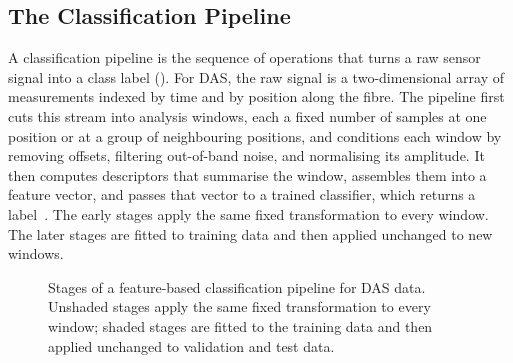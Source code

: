 \subsection{The Classification Pipeline}
\label{sec:chap2Pipeline}
A classification pipeline is the sequence of operations that turns a raw sensor signal into a class label (). For DAS, the raw signal is a two-dimensional array of measurements indexed by time and by position along the fibre. The pipeline first cuts this stream into analysis windows, each a fixed number of samples at one position or at a group of neighbouring positions, and conditions each window by removing offsets, filtering out-of-band noise, and normalising its amplitude. It then computes descriptors that summarise the window, assembles them into a feature vector, and passes that vector to a trained classifier, which returns a label~\cite{kandamali2022ml,shahabudin2025review}. The early stages apply the same fixed transformation to every window. The later stages are fitted to training data and then applied unchanged to new windows.

\begin{figure}[!htbp]
\centering
{}
\caption{Stages of a feature-based classification pipeline for DAS data. Unshaded stages apply the same fixed transformation to every window; shaded stages are fitted to the training data and then applied unchanged to validation and test data.}
\label{fig:pipeline_stages}
\end{figure}

